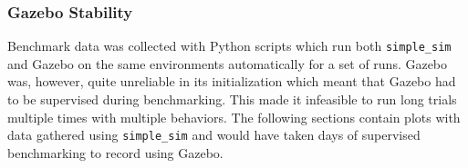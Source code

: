 \subsubsection{Gazebo Stability}
Benchmark data was collected with Python scripts which run both \texttt{simple\_sim} and Gazebo on the same environments automatically for a set of runs. Gazebo was, however, quite unreliable in its initialization which meant that Gazebo had to be supervised during benchmarking. This made it infeasible to run long trials multiple times with multiple behaviors. The following sections contain plots with data gathered using \texttt{simple\_sim} and would have taken days of supervised benchmarking to record using Gazebo.

